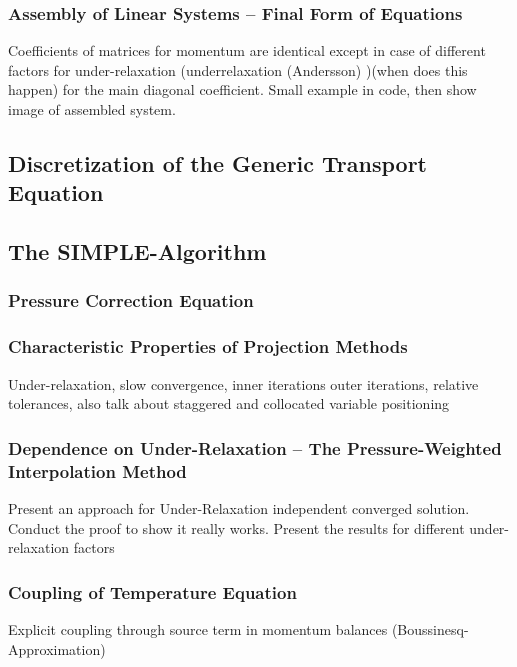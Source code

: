       \subsubsection{Assembly of Linear Systems -- Final Form of Equations}
        Coefficients of matrices for momentum are identical except in case of different factors for under-relaxation (underrelaxation (Andersson) )(when does this happen) for the main diagonal coefficient. Small example in code, then show image of assembled system.

    \subsection{Discretization of the Generic Transport Equation}

    \subsection{The SIMPLE-Algorithm}
      
      \subsubsection{Pressure Correction Equation}

      \subsubsection{Characteristic Properties of Projection Methods}

        Under-relaxation, slow convergence, inner iterations outer iterations, relative tolerances, also talk about staggered and collocated variable positioning

      \subsubsection{Dependence on Under-Relaxation -- The Pressure-Weighted Interpolation Method}

        Present an approach for Under-Relaxation independent converged solution. Conduct the proof to show it really works. Present the results for different under-relaxation factors

      \subsubsection{Coupling of Temperature Equation}

        Explicit coupling through source term in momentum balances (Boussinesq-Approximation)

